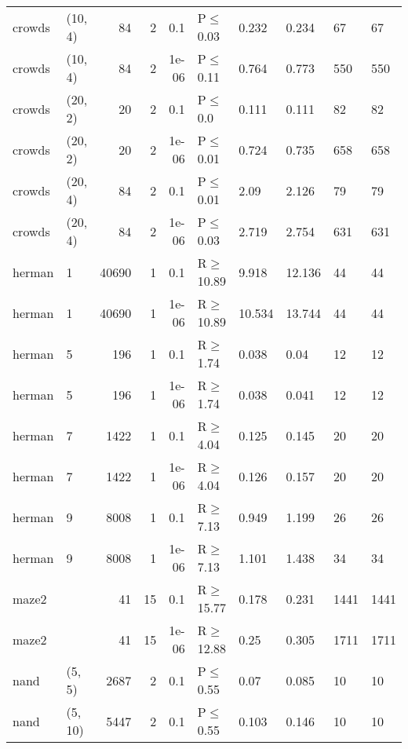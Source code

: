 \begin{longtable}{llrrrlllll}
 crowds        & (10, 4)   &     	84 &   2 & 0.1   & P$\leq$0.03  & 0.232  & 0.234   & 67      & 67      \\
 crowds        & (10, 4)   &     	84 &   2 & 1e-06 & P$\leq$0.11  & 0.764  & 0.773   & 550     & 550     \\
 crowds        & (20, 2)   &     	20 &   2 & 0.1   & P$\leq$0.0   & 0.111  & 0.111   & 82      & 82      \\
 crowds        & (20, 2)   &     	20 &   2 & 1e-06 & P$\leq$0.01  & 0.724  & 0.735   & 658     & 658     \\
 crowds        & (20, 4)   &     	84 &   2 & 0.1   & P$\leq$0.01  & 2.09   & 2.126   & 79      & 79      \\
 crowds        & (20, 4)   &     	84 &   2 & 1e-06 & P$\leq$0.03  & 2.719  & 2.754   & 631     & 631     \\
 herman        & 1         &  	40690 &   1 & 0.1   & R$\geq$10.89 & 9.918  & 12.136  & 44      & 44      \\
 herman        & 1         &  	40690 &   1 & 1e-06 & R$\geq$10.89 & 10.534 & 13.744  & 44      & 44      \\
 herman        & 5         &    	196 &   1 & 0.1   & R$\geq$1.74  & 0.038  & 0.04    & 12      & 12      \\
 herman        & 5         &    	196 &   1 & 1e-06 & R$\geq$1.74  & 0.038  & 0.041   & 12      & 12      \\
 herman        & 7         &   	1422 &   1 & 0.1   & R$\geq$4.04  & 0.125  & 0.145   & 20      & 20      \\
 herman        & 7         &   	1422 &   1 & 1e-06 & R$\geq$4.04  & 0.126  & 0.157   & 20      & 20      \\
 herman        & 9         &   	8008 &   1 & 0.1   & R$\geq$7.13  & 0.949  & 1.199   & 26      & 26      \\
 herman        & 9         &   	8008 &   1 & 1e-06 & R$\geq$7.13  & 1.101  & 1.438   & 34      & 34      \\
 maze2         &           &     	41 &  15 & 0.1   & R$\geq$15.77 & 0.178  & 0.231   & 1441    & 1441    \\
 maze2         &           &     	41 &  15 & 1e-06 & R$\geq$12.88 & 0.25   & 0.305   & 1711    & 1711    \\
 nand          & (5, 5)    &   	2687 &   2 & 0.1   & P$\leq$0.55  & 0.07   & 0.085   & 10      & 10      \\
 nand          & (5, 10)   &   	5447 &   2 & 0.1   & P$\leq$0.55  & 0.103  & 0.146   & 10      & 10      \\

\end{longtable}
